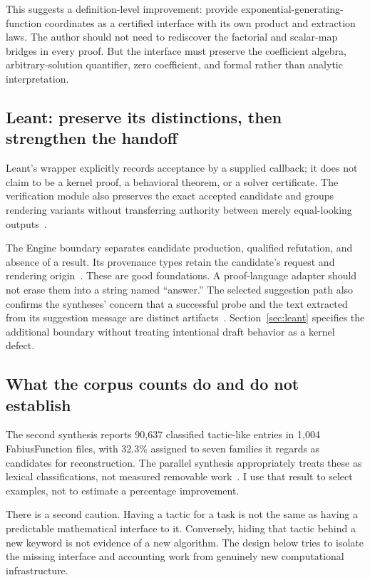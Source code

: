 \documentclass[11pt,a4paper]{article}
\newcommand{\code}[1]{\texttt{\detokenize{#1}}}
\theoremstyle{definition}
\theoremstyle{remark}
\begin{document}
This suggests a definition-level improvement: provide exponential-generating-function coordinates as a certified interface with its own product and extraction laws. The author should not need to rediscover the factorial and scalar-map bridges in every proof. But the interface must preserve the coefficient algebra, arbitrary-solution quantifier, zero coefficient, and formal rather than analytic interpretation.

\subsection{Leant: preserve its distinctions, then strengthen the handoff}
Leant's \code{Verified} wrapper explicitly records acceptance by a supplied callback; it does not claim to be a kernel proof, a behavioral theorem, or a solver certificate. The verification module also preserves the exact accepted candidate and groups rendering variants without transferring authority between merely equal-looking outputs~\cite{verification}.

The Engine boundary separates candidate production, qualified refutation, and absence of a result. Its provenance types retain the candidate's request and rendering origin~\cite{engine}. These are good foundations. A proof-language adapter should not erase them into a string named ``answer.'' The selected suggestion path also confirms the syntheses' concern that a successful probe and the text extracted from its suggestion message are distinct artifacts~\cite{main,synA}. Section~\ref{sec:leant} specifies the additional boundary without treating intentional draft behavior as a kernel defect.

\subsection{What the corpus counts do and do not establish}
The second synthesis reports 90,637 classified tactic-like entries in 1,004 FabiusFunction files, with 32.3\% assigned to seven families it regards as candidates for reconstruction. The parallel synthesis appropriately treats these as lexical classifications, not measured removable work~\cite{synA,synB}. I use that result to select examples, not to estimate a percentage improvement.

There is a second caution. Having a tactic for a task is not the same as having a predictable mathematical interface to it. Conversely, hiding that tactic behind a new keyword is not evidence of a new algorithm. The design below tries to isolate the missing interface and accounting work from genuinely new computational infrastructure.
\end{document}

